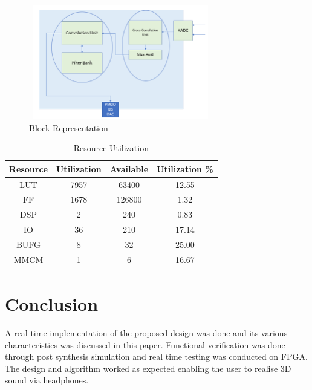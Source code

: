 \documentclass[conference]{IEEEtran}
\begin{document}
\begin{figure}
    \centering
    \includegraphics[width = 8cm, height = 5cm]{fpga_layout.png}
    \caption{Block Representation}
    \label{fig:setup}
\end{figure}
\begin{table}[]
    \centering
    \begin{tabular}{ |c|c|c|c| } 
         \hline
         \textbf{Resource} & \textbf{Utilization} & \textbf{Available} & \textbf{Utilization} \% \\ 
         \hline
         LUT & 7957 & 63400 & 12.55\\ 
         FF & 1678 & 126800 & 1.32\\
         DSP & 2 & 240 & 0.83 \\
         IO & 36 & 210 & 17.14 \\
         BUFG & 8 & 32 & 25.00 \\
         MMCM & 1 & 6 & 16.67\\
         \hline
    \end{tabular}

    \caption{Resource Utilization}
    \label{tab:resourceuti}
\end{table}

\section{Conclusion}

A real-time implementation of the proposed design was done and its various characteristics was discussed in this paper. Functional verification was done through post synthesis simulation and real time testing was conducted on FPGA. The design and algorithm worked as expected enabling the user to realise 3D sound via headphones.

\printbibliography
\end{document}
